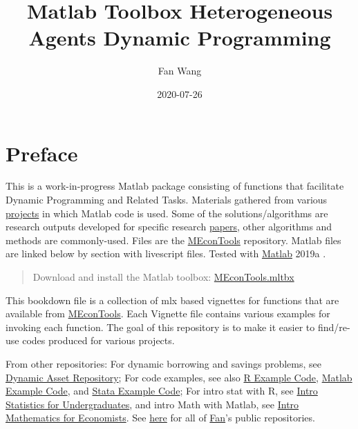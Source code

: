 \documentclass[
]{book}
\title{Matlab Toolbox Heterogeneous Agents Dynamic Programming}
\author{Fan Wang}
\date{2020-07-26}
\begin{document}
\maketitle

{
\hypersetup{linkcolor=}
\setcounter{tocdepth}{1}
\tableofcontents
}
\hypertarget{preface}{%
\chapter*{Preface}\label{preface}}

This is a work-in-progress Matlab package consisting of functions that facilitate Dynamic Programming and Related Tasks. Materials gathered from various \href{https://fanwangecon.github.io/research}{projects} in which Matlab code is used. Some of the solutions/algorithms are research outputs developed for specific research \href{https://fanwangecon.github.io/research}{papers}, other algorithms and methods are commonly-used. Files are the \href{https://github.com/FanWangEcon/MEconTools}{MEconTools} repository. Matlab files are linked below by section with livescript files. Tested with \href{https://www.mathworks.com/products/matlab.html}{Matlab} 2019a \citep{matlab}.

\begin{quote}
Download and install the Matlab toolbox: \href{https://github.com/FanWangEcon/MEconTools/blob/master/MEconTools.mltbx}{MEconTools.mltbx}
\end{quote}

This bookdown file is a collection of mlx based vignettes for functions that are available from \href{https://github.com/FanWangEcon/MEconTools}{MEconTools}. Each Vignette file contains various examples for invoking each function. The goal of this repository is to make it easier to find/re-use codes produced for various projects.

From other repositories: For dynamic borrowing and savings problems, see \href{https://fanwangecon.github.io/CodeDynaAsset/}{Dynamic Asset Repository}; For code examples, see also \href{https://fanwangecon.github.io/R4Econ/}{R Example Code}, \href{https://fanwangecon.github.io/M4Econ/}{Matlab Example Code}, and \href{https://fanwangecon.github.io/Stata4Econ/}{Stata Example Code}; For intro stat with R, see \href{https://fanwangecon.github.io/Stat4Econ/}{Intro Statistics for Undergraduates}, and intro Math with Matlab, see \href{https://fanwangecon.github.io/Math4Econ/}{Intro Mathematics for Economists}. See \href{https://github.com/FanWangEcon}{here} for all of \href{https://fanwangecon.github.io/}{Fan}'s public repositories.
\end{document}
